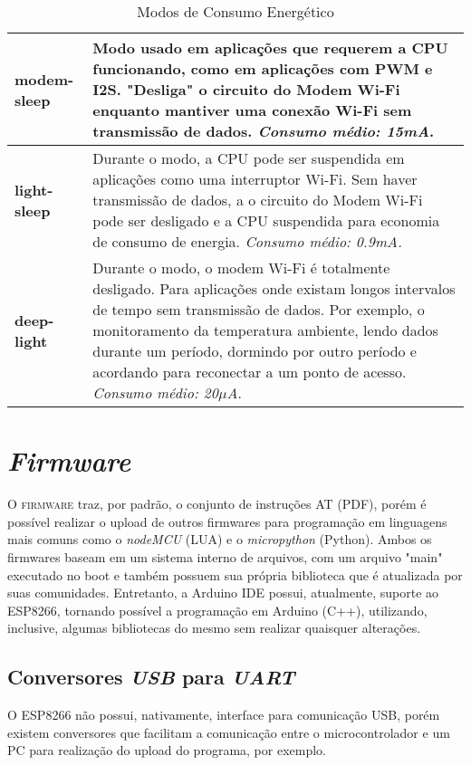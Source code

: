 \documentclass[
	11pt,				%
	openright,			%
	twoside,			%
	a5paper,			%
	english,			%
	french,				%
	spanish,			%
	brazil,				%
	sumario=tradicional
]{abntex2}
\begin{document}
\begin{table}[!ht]
\centering
\footnotesize{
\label{Modos-Energia}
\caption{Modos de Consumo Energético}
\begin{tabular}{>{\bfseries}lp{5.35cm}}
\toprule
modem-sleep & Modo usado em aplicações que requerem a CPU funcionando, como em aplicações com PWM e I2S. "Desliga" o circuito do Modem Wi-Fi enquanto mantiver uma conexão Wi-Fi sem transmissão de dados. \emph{Consumo médio: 15mA}. \\\midrule
light-sleep & Durante o modo, a CPU pode ser suspendida em aplicações como uma interruptor Wi-Fi. Sem haver transmissão de dados, a o circuito do Modem Wi-Fi pode ser desligado e a CPU suspendida para economia de consumo de energia. \emph{Consumo médio: 0.9mA.} \\\midrule
deep-light & Durante o modo, o modem Wi-Fi é totalmente desligado. Para aplicações onde existam longos intervalos de tempo sem transmissão de dados. Por exemplo, o monitoramento da temperatura ambiente, lendo dados durante um período, dormindo por outro período e acordando para reconectar a um ponto de acesso. \emph{Consumo médio: 20$\mu$A}. \\\bottomrule
\end{tabular}
}
\end{table}

\chapter{\textit{Firmware}}

\lettrine[nindent=0.35em,lhang=0.40,loversize=0.3]{O}{ firmware} traz, por padrão, o conjunto de instruções AT (PDF), porém é possível realizar o upload de outros firmwares para programação em linguagens mais comuns como o \textit{nodeMCU} (LUA) e o \textit{micropython} (Python). Ambos os firmwares baseam em um sistema interno de arquivos, com um arquivo "main" executado no boot e também possuem sua própria biblioteca que é atualizada por suas comunidades. 
Entretanto, a Arduino IDE possui, atualmente, suporte ao ESP8266, tornando possível a programação em Arduino (C++), utilizando, inclusive, algumas bibliotecas do mesmo sem realizar quaisquer alterações.

\newpage

\section{Conversores \textit{USB} para \textit{UART}}
        O ESP8266 não possui, nativamente, interface para comunicação USB, porém existem conversores que facilitam a comunicação entre o microcontrolador e um PC para realização do upload do programa, por exemplo. 
\end{document}
